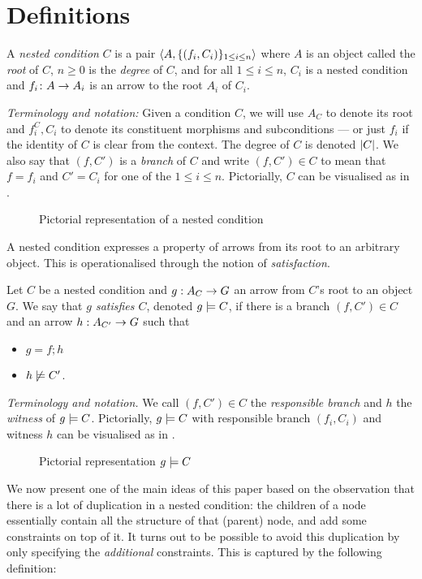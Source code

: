 \section{Definitions}

\begin{definition}
  A \emph{nested condition} $C$ is a pair $\langle{A,\{{(f_i,C_i)}\}_{1\leq i\leq n}}\rangle$ where $A$ is an object called the \emph{root} of $C$, $n\geq 0$ is the \emph{degree} of $C$, and for all $1\leq i\leq n$, $C_i$ is a nested condition and $f_i\colon A\rightarrow A_i$ is an arrow to the root $A_i$ of $C_i$.
\end{definition}
%
\emph{Terminology and notation:} Given a condition $C$, we will use $A_C$ to denote its root and $f^C_i,C_i$ to denote its constituent morphisms and subconditions --- or just $f_i$ if the identity of $C$ is clear from the context. The degree of $C$ is denoted $|{C}|$. We also say that $(f,C')$ is a \emph{branch} of $C$ and write $(f,C')\in C$ to mean that $f=f_i$ and $C'=C_i$ for one of the $1\leq i\leq n$. Pictorially, $C$ can be visualised as in .
%
\begin{figure}
  \centering
  
  \caption{Pictorial representation of a nested condition}
\end{figure}

\medskip\noindent A nested condition expresses a property of arrows from its root to an arbitrary object. This is operationalised through the notion of \emph{satisfaction}.

\begin{definition}
  Let $C$ be a nested condition and $g:A_C\rightarrow G$ an arrow from $C$'s root to an object $G$. We say that \emph{$g$ satisfies $C$}, denoted $g\models C$, if there is a branch $(f,C')\in C$ and an arrow $h:A_{C'}\rightarrow G$ such that
  \begin{itemize}
  \item $g=f;h$
  \item $h\not\models C'$.
  \end{itemize}
\end{definition}
%
\emph{Terminology and notation.} We call $(f,C')\in C$ the \emph{responsible branch} and $h$ the \emph{witness} of $g\models C$. Pictorially, $g\models C$ with responsible branch $(f_i,C_i)$ and witness $h$ can be visualised as in .
%
\begin{figure}
  \centering
  
  \caption{Pictorial representation $g\models C$}
\end{figure}
%
We now present one of the main ideas of this paper based on the observation that there is a lot of duplication in a nested condition: the children of a node essentially contain all the structure of that (parent) node, and add some constraints on top of it. It turns out to be possible to avoid this duplication by only specifying the \emph{additional} constraints. This is captured by the following definition:

